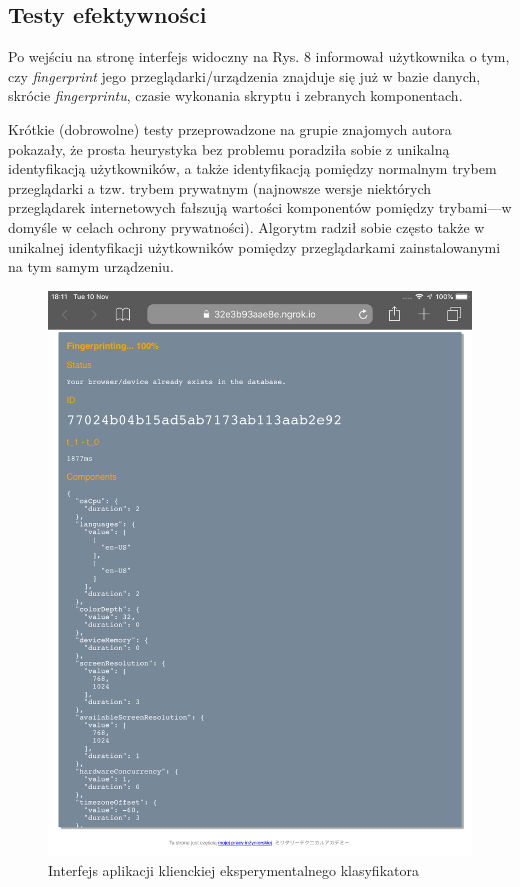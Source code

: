 \subsection{Testy efektywności}
Po wejściu na stronę interfejs widoczny na Rys. 8 informował użytkownika o tym,
czy \emph{fingerprint} jego przeglądarki/urządzenia znajduje się już w bazie
danych, skrócie \emph{fingerprintu}, czasie wykonania skryptu i zebranych
komponentach.

Krótkie (dobrowolne) testy przeprowadzone na grupie znajomych autora pokazały,
że prosta heurystyka bez problemu poradziła sobie z unikalną identyfikacją
użytkowników, a także identyfikacją pomiędzy normalnym trybem przeglądarki a
tzw. trybem prywatnym (najnowsze wersje niektórych przeglądarek internetowych
fałszują wartości komponentów pomiędzy trybami---w domyśle w celach ochrony
prywatności). Algorytm radził sobie często także w unikalnej identyfikacji
użytkowników pomiędzy przeglądarkami zainstalowanymi na tym samym urządzeniu.

\begin{figure}
	\includegraphics[width=\textwidth,keepaspectratio]{img/10}
	\caption{Interfejs aplikacji klienckiej eksperymentalnego klasyfikatora}
\end{figure}

